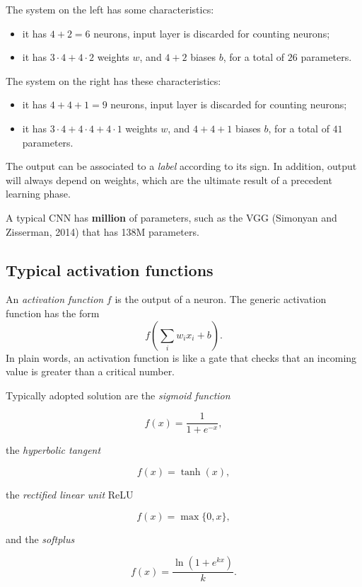 \documentclass[10pt]{report}
\begin{document}
The system on the left has some characteristics:

\begin{itemize}
\item it has \(4 + 2 = 6\) neurons, input layer is discarded for counting
neurons;
\item it has \(3 \cdot 4 + 4 \cdot 2\) weights \(w\), and \(4 + 2\) biases
\(b\), for a total of \(26\) parameters.
\end{itemize}

The system on the right has these characteristics:

\begin{itemize}
\item it has \(4 + 4 + 1 = 9\) neurons, input layer is discarded for
counting neurons;
\item it has \(3 \cdot 4 + 4 \cdot 4 + 4 \cdot 1\) weights \(w\), and
\(4 + 4 + 1\) biases \(b\), for a total of \(41\) parameters.
\end{itemize}

The output can be associated to a \emph{label} according to its sign. In
addition, output will always depend on weights, which are the ultimate
result of a precedent learning phase.

A typical CNN has \textbf{million} of parameters, such as the VGG (Simonyan and Zisserman, 2014) that has 138M parameters.

\subsection{Typical activation functions}
\label{sec:org77367cc}
An \emph{activation function} \(f\) is the output of a neuron. The generic
activation function has the form \[f\left(\sum_i w_i x_i + b\right).\]
In plain words, an activation function is like a gate that checks that
an incoming value is greater than a critical number.

Typically adopted solution are the \emph{sigmoid function}

\[f(x) = \frac{1}{1 + e^{-x}},\]

the \emph{hyperbolic tangent}

\[f(x) = \tanh{(x)},\]

the \emph{rectified linear unit} ReLU

\[f(x) = \max{\{0, x\}},\]

and the \emph{softplus}

\[f(x) = \frac{\ln{(1 + e^{kx})}}{k}.\]
\end{document}
